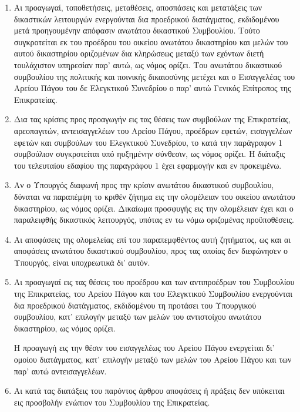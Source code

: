 \documentclass[twoside, a4paper, 10pt]{article}
\begin{document}
\begin{multicols}{2}
\begin{enumerate}
\begin{BigQuote}
\begin{enumerate}
  \item[1.] Αι προαγωγαί, τοποθετήσεις, μεταθέσεις, αποσπάσεις και μετατάξεις των δικαστικών λειτουργών ενεργούνται δια προεδρικού διατάγματος, εκδιδομένου μετά προηγουμένην απόφασιν ανωτάτου δικαστικού Συμβουλίου. Τούτο συγκροτείται εκ του προέδρου του οικείου ανωτάτου δικαστηρίου και μελών του αυτού δικαστηρίου οριζομένων δια κληρώσεως μεταξύ των εχόντων διετή τουλάχιστον υπηρεσίαν παρ' αυτώ, ως νόμος ορίζει. Του ανωτάτου δικαστικού συμβουλίου της πολιτικής και ποινικής δικαιοσύνης μετέχει και ο Εισαγγελέας του Αρείου Πάγου του δε Ελεγκτικού Συνεδρίου ο παρ' αυτώ Γενικός Επίτροπος της Επικρατείας.
  \item[2.] Δια τας κρίσεις προς προαγωγήν εις τας θέσεις των συμβούλων της Επικρατείας, αρεοπαγιτών, αντεισαγγελέων του Αρείου Πάγου, προέδρων εφετών, εισαγγελέων εφετών και συμβούλων του Ελεγκτικού Συνεδρίου, το κατά την παράγραφον 1 συμβούλιον συγκροτείται υπό ηυξημένην σύνθεσιν, ως νόμος ορίζει. Η διάταξις του τελευταίου εδαφίου της παραγράφου 1 έχει εφαρμογήν και εν προκειμένω.
  \item[3.] Αν ο Υπουργός διαφωνή προς την κρίσιν ανωτάτου δικαστικού συμβουλίου, δύναται να παραπέμψη το κριθέν ζήτημα εις την ολομέλειαν του οικείου ανωτάτου δικαστηρίου, ως νόμος ορίζει. Δικαίωμα προσφυγής εις την ολομέλειαν έχει και ο παραλειφθής δικαστικός λειτουργός, υπότας εν τω νόμω οριζομένας προϋποθέσεις.
  \item[4.] Αι αποφάσεις της ολομελείας επί του παραπεμφθέντος αυτή ζητήματος, ως και αι αποφάσεις ανωτάτου δικαστικού συμβουλίου, προς τας οποίας δεν διεφώνησεν ο Υπουργός, είναι υποχρεωτικά δι' αυτόν.
  \item[5.] Αι προαγωγαί εις τας θέσεις του προέδρου και των αντιπροέδρων του Συμβουλίου της Επικρατείας, του Αρείου Πάγου και του Ελεγκτικού Συμβουλίου ενεργούνται δια προεδρικού διατάγματος, εκδιδομένου τη προτάσει του Υπουργικού συμβουλίου, κατ' επιλογήν μεταξύ των μελών του αντιστοίχου ανωτάτου δικαστηρίου, ως νόμος ορίζει.

	Η προαγωγή εις την θέσιν του εισαγγελέως του Αρείου Πάγου ενεργείται δι' ομοίου διατάγματος, κατ' επιλογήν μεταξύ των μελών του Αρείου Πάγου και των παρ' αυτώ αντεισαγγελέων.
  \item[6.] Αι κατά τας διατάξεις του παρόντος άρθρου αποφάσεις ή πράξεις δεν υπόκειται εις προσβολήν ενώπιον του Συμβουλίου της Επικρατείας.
\end{enumerate}


\end{BigQuote}
\end{enumerate}
\end{multicols}
\end{document}
